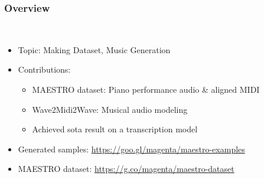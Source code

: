 \documentclass[dvipdfmx]{beamer}
\begin{document}
\begin{frame}
    \titlepage
\end{frame}


\begin{frame}
    \frametitle{Overview}
    \\
    \begin{itemize}
        \item Topic: Making Dataset, Music Generation
        \item Contributions:
        \begin{itemize}
            \item MAESTRO dataset: Piano performance audio \& aligned MIDI
            \item Wave2Midi2Wave: Musical audio modeling
            \item Achieved sota result on a transcription model
        \end{itemize}
    \end{itemize}
    \begin{itemize}
        \item Generated samples: {\scriptsize \url{https://goo.gl/magenta/maestro-examples}}
        \item MAESTRO dataset: {\scriptsize \url{https://g.co/magenta/maestro-dataset}}
    \end{itemize}
\end{frame}
\end{document}
